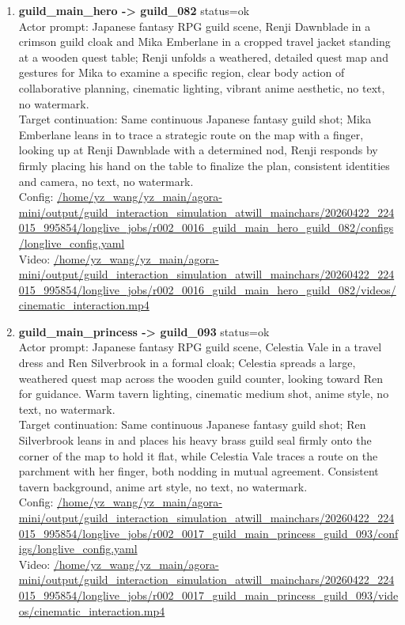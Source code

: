 \documentclass[11pt,a4paper]{article}
\begin{document}
\begin{enumerate}
\item \textbf{guild\_main\_hero -> guild\_082} status=ok\\\newline Actor prompt: Japanese fantasy RPG guild scene, Renji Dawnblade in a crimson guild cloak and Mika Emberlane in a cropped travel jacket standing at a wooden quest table; Renji unfolds a weathered, detailed quest map and gestures for Mika to examine a specific region, clear body action of collaborative planning, cinematic lighting, vibrant anime aesthetic, no text, no watermark.\\\newline Target continuation: Same continuous Japanese fantasy guild shot; Mika Emberlane leans in to trace a strategic route on the map with a finger, looking up at Renji Dawnblade with a determined nod, Renji responds by firmly placing his hand on the table to finalize the plan, consistent identities and camera, no text, no watermark.\\\newline Config: \url{/home/yz\_wang/yz\_main/agora-mini/output/guild\_interaction\_simulation\_atwill\_mainchars/20260422\_224015\_995854/longlive\_jobs/r002\_0016\_guild\_main\_hero\_guild\_082/configs/longlive\_config.yaml}\\\newline Video: \url{/home/yz\_wang/yz\_main/agora-mini/output/guild\_interaction\_simulation\_atwill\_mainchars/20260422\_224015\_995854/longlive\_jobs/r002\_0016\_guild\_main\_hero\_guild\_082/videos/cinematic\_interaction.mp4}
\item \textbf{guild\_main\_princess -> guild\_093} status=ok\\\newline Actor prompt: Japanese fantasy RPG guild scene, Celestia Vale in a travel dress and Ren Silverbrook in a formal cloak; Celestia spreads a large, weathered quest map across the wooden guild counter, looking toward Ren for guidance. Warm tavern lighting, cinematic medium shot, anime style, no text, no watermark.\\\newline Target continuation: Same continuous Japanese fantasy guild shot; Ren Silverbrook leans in and places his heavy brass guild seal firmly onto the corner of the map to hold it flat, while Celestia Vale traces a route on the parchment with her finger, both nodding in mutual agreement. Consistent tavern background, anime art style, no text, no watermark.\\\newline Config: \url{/home/yz\_wang/yz\_main/agora-mini/output/guild\_interaction\_simulation\_atwill\_mainchars/20260422\_224015\_995854/longlive\_jobs/r002\_0017\_guild\_main\_princess\_guild\_093/configs/longlive\_config.yaml}\\\newline Video: \url{/home/yz\_wang/yz\_main/agora-mini/output/guild\_interaction\_simulation\_atwill\_mainchars/20260422\_224015\_995854/longlive\_jobs/r002\_0017\_guild\_main\_princess\_guild\_093/videos/cinematic\_interaction.mp4}
\end{enumerate}
\end{document}
